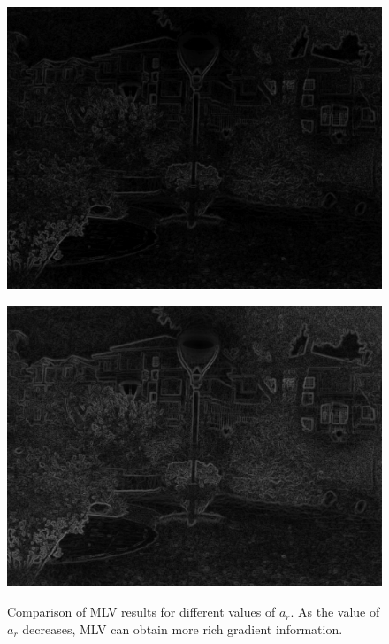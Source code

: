 \begin{figure}[t]
\centering
\begin{minipage}[b]{0.49\hsize}
\centering
\includegraphics[height=0.65\hsize]{images/noise/MLV_10.eps}
 \label{fig:mlv_normal}
\end{minipage}
\begin{minipage}[b]{0.49\hsize}
\centering
\includegraphics[height=0.65\hsize]{images/noise/MLV_05.eps}
 \label{fig:mlv_pow}
\end{minipage}
\caption{Comparison of MLV results for different values of $a_{r}$. As the value of $a_{r}$ decreases, MLV can obtain more rich gradient information.}
\label{fig:mlv_change}
\end{figure}
